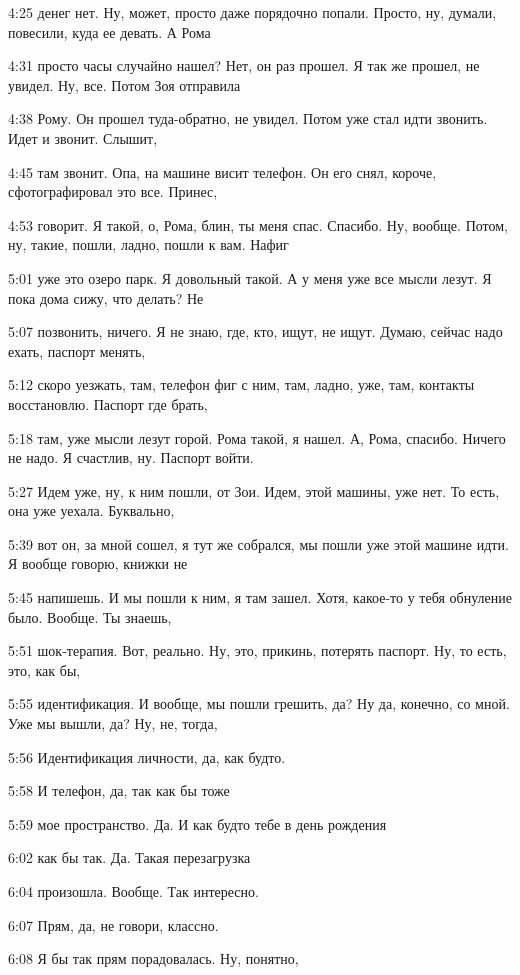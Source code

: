 4:25
денег нет. Ну, может, просто даже порядочно попали. Просто, ну, думали, повесили, куда ее девать. А Рома

4:31
просто часы случайно нашел? Нет, он раз прошел. Я так же прошел, не увидел. Ну, все. Потом Зоя отправила

4:38
Рому. Он прошел туда-обратно, не увидел. Потом уже стал идти звонить. Идет и звонит. Слышит,

4:45
там звонит. Опа, на машине висит телефон. Он его снял, короче, сфотографировал это все. Принес,

4:53
говорит. Я такой, о, Рома, блин, ты меня спас. Спасибо. Ну, вообще. Потом, ну, такие, пошли, ладно, пошли к вам. Нафиг

5:01
уже это озеро парк. Я довольный такой. А у меня уже все мысли лезут. Я пока дома сижу, что делать? Не

5:07
позвонить, ничего. Я не знаю, где, кто, ищут, не ищут. Думаю, сейчас надо ехать, паспорт менять,

5:12
скоро уезжать, там, телефон фиг с ним, там, ладно, уже, там, контакты восстановлю. Паспорт где брать,

5:18
там, уже мысли лезут горой. Рома такой, я нашел. А, Рома, спасибо. Ничего не надо. Я счастлив, ну. Паспорт войти.

5:27
Идем уже, ну, к ним пошли, от Зои. Идем, этой машины, уже нет. То есть, она уже уехала. Буквально,

5:39
вот он, за мной сошел, я тут же собрался, мы пошли уже этой машине идти. Я вообще говорю, книжки не

5:45
напишешь. И мы пошли к ним, я там зашел. Хотя, какое-то у тебя обнуление было. Вообще. Ты знаешь,

5:51
шок-терапия. Вот, реально. Ну, это, прикинь, потерять паспорт. Ну, то есть, это, как бы,

5:55
идентификация. И вообще, мы пошли грешить, да? Ну да, конечно, со мной. Уже мы вышли, да? Ну, не, тогда,

5:56
Идентификация личности, да, как будто.

5:58
И телефон, да, так как бы тоже

5:59
мое пространство. Да. И как будто тебе в день рождения

6:02
как бы так. Да. Такая перезагрузка

6:04
произошла. Вообще. Так интересно.

6:07
Прям, да, не говори, классно.

6:08
Я бы так прям порадовалась. Ну, понятно,

